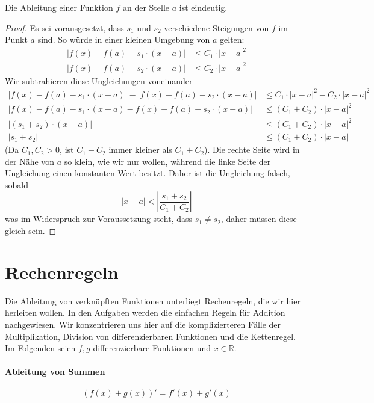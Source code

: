 \begin{lemma}
Die Ableitung einer Funktion $f$ an der Stelle $a$ ist eindeutig. 
\end{lemma}
\begin{proof}
Es sei vorausgesetzt, dass $s_1$ und $s_2$ verschiedene Steigungen von $f$ im Punkt $a$ sind. So würde in einer kleinen Umgebung von $a$ gelten:
\begin{equation*}
\begin{split}
|f(x)-f(a) -s_1\cdot (x-a)| &\le C_1\cdot |x-a|^2 \\
|f(x)-f(a) -s_2\cdot (x-a)| &\le C_2\cdot |x-a|^2
\end{split}
\end{equation*}
Wir subtrahieren diese Ungleichungen voneinander
\begin{equation}
\begin{split}
|f(x)-f(a) -s_1\cdot (x-a)|-|f(x)-f(a) -s_2\cdot (x-a)| &\le C_1\cdot |x-a|^2-C_2\cdot |x-a|^2 \\
|f(x)-f(a) -s_1\cdot (x-a)-f(x)-f(a) -s_2\cdot (x-a)| &\le (C_1+C_2)\cdot |x-a|^2 \\
|(s_1+s_2)\cdot (x-a)| &\le (C_1+C_2)\cdot |x-a|^2 \\
|s_1+s_2| &\le (C_1+C_2)\cdot |x-a|
\end{split}
\end{equation}
(Da $C_1,C_2 >0$, ist $C_1-C_2$ immer kleiner als $C_1+C_2$). Die rechte Seite wird in der Nähe von $a$ so klein, wie wir nur wollen, während die linke Seite der Ungleichung einen konstanten Wert besitzt. Daher ist die Ungleichung falsch, sobald 
\[
|x-a| < \left| \frac{s_1+s_2}{C_1+C_2} \right|
\]
was im Widerspruch zur Voraussetzung steht, dass $s_1\ne s_2$, daher müssen diese gleich sein.
\end{proof}

\section{Rechenregeln}

Die Ableitung von verknüpften Funktionen unterliegt Rechenregeln, die wir hier herleiten wollen. In den Aufgaben werden die einfachen Regeln für Addition nachgewiesen. Wir konzentrieren uns hier auf die komplizierteren Fälle der Multiplikation, Division von differenzierbaren Funktionen und die Kettenregel. Im Folgenden seien $f,g$ differenzierbare Funktionen und $x\in \mathbb{R}$.

\paragraph{Ableitung von Summen}
\begin{equation}\label{eq:diff0}
\left(f(x)+g(x) \right)' = f'(x)+ g'(x)
\end{equation}

